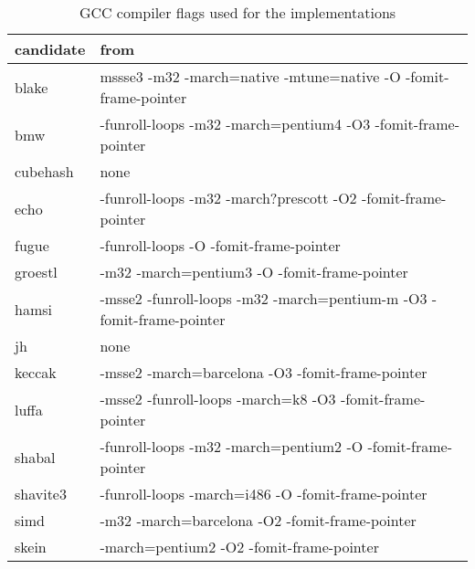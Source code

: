 \begin{table}
  \centering
  \begin{tabular}{ | l | l | }
    \hline
    \textbf{candidate} & \textbf{from}  \\ \hline
     blake       & mssse3 -m32 -march=native -mtune=native -O -fomit-frame-pointer  \\ \hline
     bmw         & -funroll-loops -m32 -march=pentium4 -O3 -fomit-frame-pointer     \\ \hline
     cubehash    & none                                                             \\ \hline
     echo        & -funroll-loops -m32 -march?prescott -O2 -fomit-frame-pointer     \\ \hline
     fugue       & -funroll-loops -O -fomit-frame-pointer                           \\ \hline
     groestl     & -m32 -march=pentium3 -O -fomit-frame-pointer                     \\ \hline
     hamsi       & -msse2 -funroll-loops -m32 -march=pentium-m -O3 -fomit-frame-pointer\\ \hline
     jh          & none                                                             \\ \hline
     keccak      & -msse2 -march=barcelona -O3 -fomit-frame-pointer                 \\ \hline
     luffa       & -msse2 -funroll-loops -march=k8 -O3 -fomit-frame-pointer         \\ \hline
     shabal      & -funroll-loops -m32 -march=pentium2 -O -fomit-frame-pointer      \\ \hline
     shavite3    & -funroll-loops -march=i486 -O -fomit-frame-pointer               \\ \hline
     simd        & -m32 -march=barcelona -O2 -fomit-frame-pointer                   \\ \hline
     skein       & -march=pentium2 -O2 -fomit-frame-pointer                         \\ \hline
  \end{tabular}
  \caption{\ac{GCC} compiler flags used for the implementations}
  \label{tbl:sha3:compilerflags}
\end{table}
